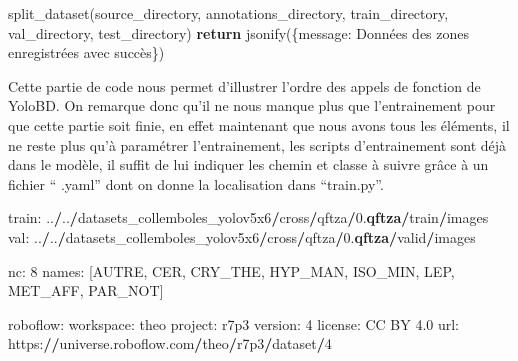 \documentclass[
  10pt,
]{article}
\newenvironment{Shaded}{\begin{snugshade}}{\end{snugshade}}
\newcommand{\ControlFlowTok}[1]{\textcolor[rgb]{0.13,0.29,0.53}{\textbf{#1}}}
\newcommand{\DecValTok}[1]{\textcolor[rgb]{0.00,0.00,0.81}{#1}}
\newcommand{\ErrorTok}[1]{\textcolor[rgb]{0.64,0.00,0.00}{\textbf{#1}}}
\newcommand{\FloatTok}[1]{\textcolor[rgb]{0.00,0.00,0.81}{#1}}
\newcommand{\NormalTok}[1]{#1}
\newcommand{\OperatorTok}[1]{\textcolor[rgb]{0.81,0.36,0.00}{\textbf{#1}}}
\newcommand{\StringTok}[1]{\textcolor[rgb]{0.31,0.60,0.02}{#1}}
\begin{document}
\begin{Shaded}
\begin{Highlighting}[]
\NormalTok{    split\_dataset(source\_directory, annotations\_directory,}
\NormalTok{    train\_directory, val\_directory, test\_directory)}
    \ControlFlowTok{return}\NormalTok{ jsonify(\{}\StringTok{\textquotesingle{}message\textquotesingle{}}\NormalTok{: }\StringTok{\textquotesingle{}Données des zones enregistrées avec succès\textquotesingle{}}\NormalTok{\})}
\end{Highlighting}
\end{Shaded}

Cette partie de code nous permet d'illustrer l'ordre des appels de
fonction de YoloBD. On remarque donc qu'il ne nous manque plus que
l'entrainement pour que cette partie soit finie, en effet maintenant que
nous avons tous les éléments, il ne reste plus qu'à paramétrer
l'entrainement, les scripts d'entrainement sont déjà dans le modèle, il
suffit de lui indiquer les chemin et classe à suivre grâce à un fichier
`` .yaml'' dont on donne la localisation dans ``train.py''.

\begin{Shaded}
\begin{Highlighting}[]
\NormalTok{train: ..}\OperatorTok{/}\NormalTok{..}\OperatorTok{/}\NormalTok{datasets\_collemboles\_yolov5x6}\OperatorTok{/}\NormalTok{cross}\OperatorTok{/}\NormalTok{qftza}\OperatorTok{/}\FloatTok{0.}\ErrorTok{qftza}\OperatorTok{/}\NormalTok{train}\OperatorTok{/}\NormalTok{images}
\NormalTok{val: ..}\OperatorTok{/}\NormalTok{..}\OperatorTok{/}\NormalTok{datasets\_collemboles\_yolov5x6}\OperatorTok{/}\NormalTok{cross}\OperatorTok{/}\NormalTok{qftza}\OperatorTok{/}\FloatTok{0.}\ErrorTok{qftza}\OperatorTok{/}\NormalTok{valid}\OperatorTok{/}\NormalTok{images}

\NormalTok{nc: }\DecValTok{8}
\NormalTok{names: [}\StringTok{\textquotesingle{}AUTRE\textquotesingle{}}\NormalTok{, }\StringTok{\textquotesingle{}CER\textquotesingle{}}\NormalTok{, }\StringTok{\textquotesingle{}CRY\_THE\textquotesingle{}}\NormalTok{, }\StringTok{\textquotesingle{}HYP\_MAN\textquotesingle{}}\NormalTok{, }\StringTok{\textquotesingle{}ISO\_MIN\textquotesingle{}}\NormalTok{, }\StringTok{\textquotesingle{}LEP\textquotesingle{}}\NormalTok{, }\StringTok{\textquotesingle{}MET\_AFF\textquotesingle{}}\NormalTok{, }\StringTok{\textquotesingle{}PAR\_NOT\textquotesingle{}}\NormalTok{]}

\NormalTok{roboflow:}
\NormalTok{  workspace: theo}
\NormalTok{  project: r7p3}
\NormalTok{  version: }\DecValTok{4}
\NormalTok{  license: CC BY }\FloatTok{4.0}
\NormalTok{  url: https:}\OperatorTok{//}\NormalTok{universe.roboflow.com}\OperatorTok{/}\NormalTok{theo}\OperatorTok{/}\NormalTok{r7p3}\OperatorTok{/}\NormalTok{dataset}\OperatorTok{/}\DecValTok{4}
\end{Highlighting}
\end{Shaded}
\end{document}
